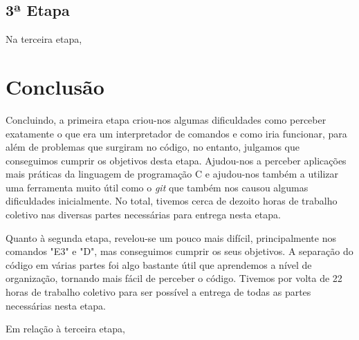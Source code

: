 \documentclass[12pt,a4paper,portuges]{article}
\begin{document}
\newpage

\subsection{\textbf{3ª Etapa}}

Na terceira etapa, 

\newpage

\section{\textbf{Conclusão}}

Concluindo, a primeira etapa criou-nos algumas dificuldades como perceber exatamente o que era um interpretador de comandos e como iria funcionar, para além de problemas que surgiram no código, no entanto, julgamos que conseguimos cumprir os objetivos desta etapa. Ajudou-nos a perceber aplicações mais práticas da linguagem de programação C e ajudou-nos também a utilizar uma ferramenta muito útil como o \textit{git} que também nos causou algumas dificuldades inicialmente. No total, tivemos cerca de dezoito horas de trabalho coletivo nas diversas partes necessárias para entrega nesta etapa.

Quanto à segunda etapa, revelou-se um pouco mais difícil, principalmente nos comandos "E3" e "D", mas conseguimos cumprir os seus objetivos. A separação do código em várias partes foi algo bastante útil que aprendemos a nível de organização, tornando mais fácil de perceber o código. Tivemos por volta de 22 horas de trabalho coletivo para ser possível a entrega de todas as partes necessárias nesta etapa.

Em relação à terceira etapa,
\end{document}

